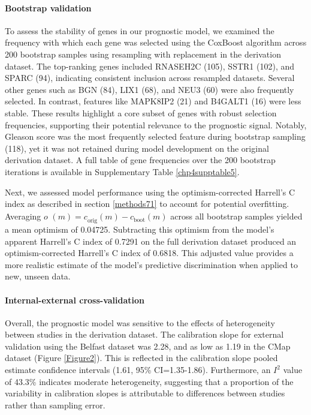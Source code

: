 \paragraph{Bootstrap validation}
To assess the stability of genes in our prognostic model, we examined the frequency with which each gene was selected using the CoxBoost algorithm across 200 bootstrap samples using resampling with replacement in the derivation dataset. The top-ranking genes included RNASEH2C (105), SSTR1 (102), and SPARC (94), indicating consistent inclusion across resampled datasets. Several other genes such as BGN (84), LIX1 (68), and NEU3 (60) were also frequently selected. In contrast, features like MAPK8IP2 (21) and B4GALT1 (16) were less stable. These results highlight a core subset of genes with robust selection frequencies, supporting their potential relevance to the prognostic signal. Notably, Gleason score was the most frequently selected feature during bootstrap sampling (118), yet it was not retained during model development on the original derivation dataset. A full table of gene frequencies over the 200 bootstrap iterations is available in Supplementary Table \ref{chp4supptable5}. 
\par
Next, we assessed model performance using the optimism-corrected Harrell’s C index as described in section \ref{methods71} to account for potential overfitting. Averaging $o^{\phantom{(}}(m) = c_{\text{orig}}^{\phantom{(}}(m) - c_{\text{boot}}^{\phantom{(}}(m)$ across all bootstrap samples yielded a mean optimism of 0.04725. Subtracting this optimism from the model’s apparent Harrell’s C index of 0.7291 on the full derivation dataset produced an optimism-corrected Harrell’s C index of 0.6818. This adjusted value provides a more realistic estimate of the model’s predictive discrimination when applied to new, unseen data.

\paragraph{Internal-external cross-validation}
Overall, the prognostic model was sensitive to the effects of heterogeneity between studies in the derivation dataset. The calibration slope for external validation using the Belfast dataset was 2.28, and as low as 1.19 in the CMap dataset (Figure \ref{Figure2}). This is reflected in the calibration slope pooled estimate confidence intervals (1.61, 95\% CI=1.35-1.86). Furthermore, an $I^2$ value of 43.3\% indicates moderate heterogeneity, suggesting that a proportion of the variability in calibration slopes is attributable to differences between studies rather than sampling error.

